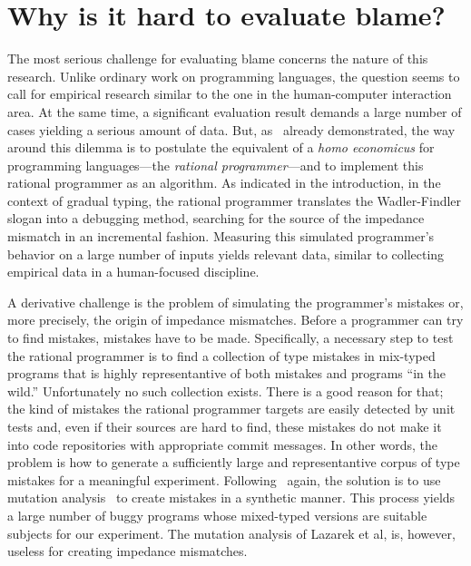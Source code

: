 
\section{Why is it hard to evaluate blame?}

The most serious challenge for evaluating blame concerns 
the nature of this research. Unlike ordinary
work on programming languages, the question seems to call for empirical research
similar to the one in the human-computer interaction area. At the same time, a
significant evaluation result demands a large number of cases yielding a serious
amount of data. But, as~\citet{lksfd-popl-2020} already demonstrated, the way
around this dilemma is to postulate the equivalent of a {\it homo economicus\/}
for programming languages---the {\em rational programmer\/}---and to implement
this rational programmer as an algorithm.  As indicated in the introduction, in
the context of gradual typing, the rational programmer translates the
Wadler-Findler slogan into a debugging method, searching for the source of the
impedance mismatch in an incremental fashion. Measuring this simulated
programmer's behavior on a large number of inputs yields relevant 
data, similar to collecting empirical data in a human-focused discipline. 

A derivative challenge is the problem of simulating the programmer's
mistakes or, more precisely, the origin of impedance mismatches. Before a
programmer can try to find mistakes, mistakes have to be made.
Specifically, a necessary step to test the rational programmer is to find
a collection of  type mistakes in  mix-typed programs that is highly
representantive of both mistakes and programs ``in the wild.''
Unfortunately no such collection exists.  There is a good reason for that;
the kind of mistakes the rational programmer targets are easily detected
by unit tests and, even if their sources are hard to find, these mistakes do not make it
into code repositories with appropriate commit messages.  In other words, the problem is how to generate a
sufficiently large and representantive corpus of type mistakes for a meaningful
experiment.  Following~\citet{lksfd-popl-2020} again, the solution is to
use mutation analysis~\cite{lipton1971fault, demillo1978hints,
jia2011analysis} to create mistakes in a synthetic manner. This process
yields a large number of buggy programs whose mixed-typed versions are
suitable subjects for our experiment.  The mutation analysis of Lazarek et
al, is, however, useless for creating impedance mismatches.

